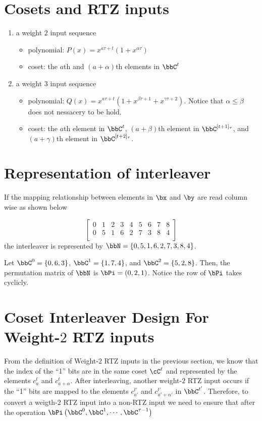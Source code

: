 \documentclass[11pt, oneside, dvipdfmx]{book}
\begin{document}
\section{Cosets and RTZ inputs}

\begin{enumerate}
\item a weight $2$ input sequence
\begin{itemize}
	\item polynomial: $P(x)=x^{a\tau+t}(1+x^{\alpha \tau})$
	\item coset: the $a$th and $(a+\alpha)$th elements in $\bbC^t$
\end{itemize}
\item a weight $3$ input sequence
\begin{itemize}
	\item polynomial: $Q(x) =x^{a\tau+t}(1+x^{\beta \tau +1}+x^{\gamma \tau +2})$. Notice that $\alpha \leq \beta$ does not nessacery to be hold.
	\item coset: the $a$th element in $\bbC^{t}$, $(a+\beta)$th element in $\bbC^{[t+1]_\tau}$, and $(a+\gamma)$th element in $\bbC^{[t+2]_\tau}$.
\end{itemize}
\end{enumerate}

\section{Representation of interleaver}
If the mapping relationship between elements in $\bx$ and $\by$ are read column wise as shown below

$$  
 \begin{bmatrix}
0 & 1 & 2 & 3 & 4 & 5 & 6 & 7 & 8 \\
0 & 5 & 1 & 6 & 2 & 7 & 3 & 8 & 4 \\
\end{bmatrix}
$$
the interleaver is represented by $\bbN=\{0,5,1,6,2,7,3,8,4\}$.

Let $\bbC^0=\{0,6,3\}$, $\bbC^1=\{1,7,4\}$, and $\bbC^2=\{5,2,8\}$. Then, the permutation matrix of $\bbN$ is
$\bPi = (0,2,1)$. Notice the row of $\bPi$ takes cyclicly.


\section{Coset Interleaver Design For Weight-$2$ RTZ inputs}
From the definition of Weight-$2$ RTZ inputs in the previous section, we know that the index of the ``1'' bits are in the same coset $\cC^t$ and represented by the elements $c_a^t$ and $c_{a+\alpha}^t$. After interleaving, another weight-$2$ RTZ input occurs if the ``1'' bits are mapped to the elements $c_{a'}^{t'}$ and $c_{a'+\alpha'}^{t'}$
 in $\bbC^{t'}$.
Therefore, to convert a weigth-$2$ RTZ input into a non-RTZ input we need to ensure that after the operation $\bPi\left(\bbC^0,\bbC^1,\cdots,\bbC^{\tau-1}\right)$ 
\end{document}
